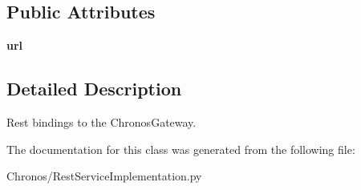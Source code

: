 \subsection*{Public Attributes}
\begin{DoxyCompactItemize}
\item 
{\bfseries url}\hypertarget{classChronos_1_1RestServiceImplementation_1_1ChronosGatewayRestClient_a136a786d80ad3db11d609ba4367e4c4c}{}\label{classChronos_1_1RestServiceImplementation_1_1ChronosGatewayRestClient_a136a786d80ad3db11d609ba4367e4c4c}

\end{DoxyCompactItemize}


\subsection{Detailed Description}
Rest bindings to the Chronos\+Gateway. 



The documentation for this class was generated from the following file\+:\begin{DoxyCompactItemize}
\item 
Chronos/Rest\+Service\+Implementation.\+py\end{DoxyCompactItemize}
